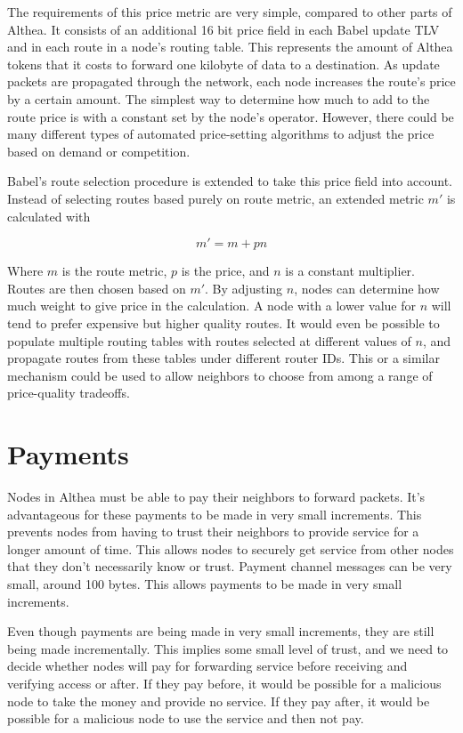 \documentclass[11pt]{article}
\begin{document}
The requirements of this price metric are very simple, compared to other parts of Althea. It consists of an additional 16 bit price field in each Babel update TLV and in each route in a node’s routing table. This represents the amount of Althea tokens that it costs to forward one kilobyte of data to a destination. As update packets are propagated through the network, each node increases the route’s price by a certain amount. The simplest way to determine how much to add to the route price is with a constant set by the node’s operator. However, there could be many different types of automated price-setting algorithms to adjust the price based on demand or competition.

\pagebreak[3]

Babel’s route selection procedure is extended to take this price field into account. Instead of selecting routes based purely on route metric, an extended metric $m'$ is calculated with

\[
m'= m+pn
\]

Where $m$ is the route metric, $p$ is the price, and $n$ is a constant multiplier. Routes are then chosen based on $m'$. By adjusting $n$, nodes can determine how much weight to give price in the calculation. A node with a lower value for $n$ will tend to prefer expensive but higher quality routes. It would even be possible to populate multiple routing tables with routes selected at different values of $n$, and propagate routes from these tables under different router IDs. This or a similar mechanism could be used to allow neighbors to choose from among a range of price-quality tradeoffs.

\section{Payments}
\label{sec:payments}
Nodes in Althea must be able to pay their neighbors to forward packets. It’s advantageous for these payments to be made in very small increments. This prevents nodes from having to trust their neighbors to provide service for a longer amount of time. This allows nodes to securely get service from other nodes that they don’t necessarily know or trust. Payment channel messages can be very small, around 100 bytes. This allows payments to be made in very small increments.

Even though payments are being made in very small increments, they are still being made incrementally. This implies some small level of trust, and we need to decide whether nodes will pay for forwarding service before receiving and verifying access or after. If they pay before, it would be possible for a malicious node to take the money and provide no service. If they pay after, it would be possible for a malicious node to use the service and then not pay.
 
\end{document}
